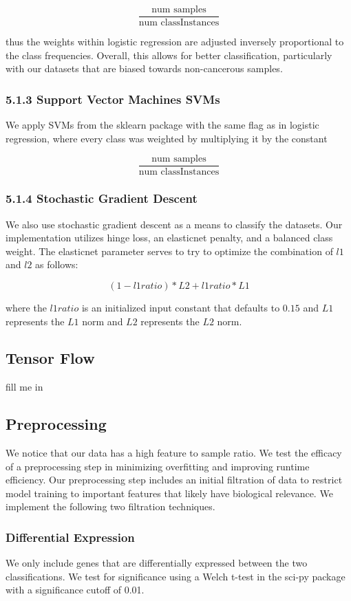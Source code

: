 \documentclass[12pt]{scrartcl}
\begin{document}
    $$\frac{\textrm{num samples}}{\textrm{num classInstances}}$$
    
    thus the weights within logistic regression are adjusted inversely proportional to the class frequencies. Overall, this allows for better classification, particularly with our datasets that are biased towards non-cancerous samples. 
    \subsubsection*{5.1.3 Support Vector Machines SVMs}
    We apply SVMs from the sklearn package with the same flag as in logistic regression, where every class was weighted by multiplying it by the constant
    
	$$\frac{\textrm{num samples}}{\textrm{num classInstances}}$$
    
    \subsubsection*{5.1.4 Stochastic Gradient Descent}
    We also use stochastic gradient descent as a means to classify the datasets. Our implementation utilizes hinge loss, an elasticnet penalty, and a balanced class weight. The elasticnet parameter serves to try to optimize the combination of $l1$ and $l2$ as follows:
    
    $$(1-l1ratio)*L2 +l1ratio*L1$$
    
    where the $l1ratio$ is an initialized input constant that defaults to $0.15$ and $L1$ represents the $L1$ norm and $L2$ represents the $L2$ norm. 
    


	\subsection{Tensor Flow}
    fill me in

    \subsection{Preprocessing}
We notice that our data has a high feature to sample ratio. We test the efficacy of a preprocessing step in minimizing overfitting and improving runtime efficiency. Our preprocessing step includes an initial filtration of data to restrict model training to important features that likely have biological relevance. We implement the following two filtration techniques.

    \subsubsection{Differential Expression}
We only include genes that are differentially expressed between the two classifications. We test for significance using a Welch t-test in the sci-py package with a significance cutoff of 0.01. 
\end{document}
